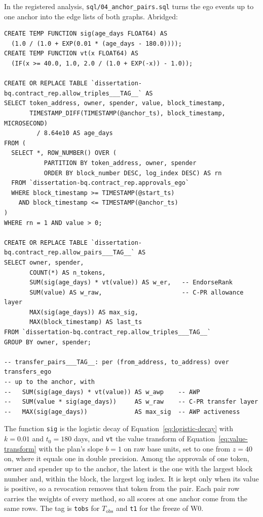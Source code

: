 
In the registered analysis, \texttt{sql/04\_anchor\_pairs.sql} turns the ego events up to one anchor into the edge lists of both graphs. Abridged:

\begin{verbatim}
CREATE TEMP FUNCTION sig(age_days FLOAT64) AS
  (1.0 / (1.0 + EXP(0.01 * (age_days - 180.0))));
CREATE TEMP FUNCTION vt(x FLOAT64) AS
  (IF(x >= 40.0, 1.0, 2.0 / (1.0 + EXP(-x)) - 1.0));

CREATE OR REPLACE TABLE `dissertation-bq.contract_rep.allow_triples___TAG__` AS
SELECT token_address, owner, spender, value, block_timestamp,
       TIMESTAMP_DIFF(TIMESTAMP(@anchor_ts), block_timestamp, MICROSECOND)
         / 8.64e10 AS age_days
FROM (
  SELECT *, ROW_NUMBER() OVER (
           PARTITION BY token_address, owner, spender
           ORDER BY block_number DESC, log_index DESC) AS rn
  FROM `dissertation-bq.contract_rep.approvals_ego`
  WHERE block_timestamp >= TIMESTAMP(@start_ts)
    AND block_timestamp <= TIMESTAMP(@anchor_ts)
)
WHERE rn = 1 AND value > 0;

CREATE OR REPLACE TABLE `dissertation-bq.contract_rep.allow_pairs___TAG__` AS
SELECT owner, spender,
       COUNT(*) AS n_tokens,
       SUM(sig(age_days) * vt(value)) AS w_er,   -- EndorseRank
       SUM(value) AS w_raw,                      -- C-PR allowance layer
       MAX(sig(age_days)) AS max_sig,
       MAX(block_timestamp) AS last_ts
FROM `dissertation-bq.contract_rep.allow_triples___TAG__`
GROUP BY owner, spender;

-- transfer_pairs___TAG__: per (from_address, to_address) over transfers_ego
-- up to the anchor, with
--   SUM(sig(age_days) * vt(value)) AS w_awp    -- AWP
--   SUM(value * sig(age_days))     AS w_raw    -- C-PR transfer layer
--   MAX(sig(age_days))             AS max_sig  -- AWP activeness
\end{verbatim}

The function \texttt{sig} is the logistic decay of Equation~\eqref{eq:logistic-decay} with $k=0.01$ and $t_0=180$ days, and \texttt{vt} the value transform of Equation~\eqref{eq:value-transform} with the plan's slope $b=1$ on raw base units, set to one from $z=40$ on, where it equals one in double precision. Among the approvals of one token, owner and spender up to the anchor, the latest is the one with the largest block number and, within the block, the largest log index. It is kept only when its value is positive, so a revocation removes that token from the pair. Each pair row carries the weights of every method, so all scores at one anchor come from the same rows. The tag is \texttt{tobs} for $T_{\text{obs}}$ and \texttt{t1} for the freeze of W0.

